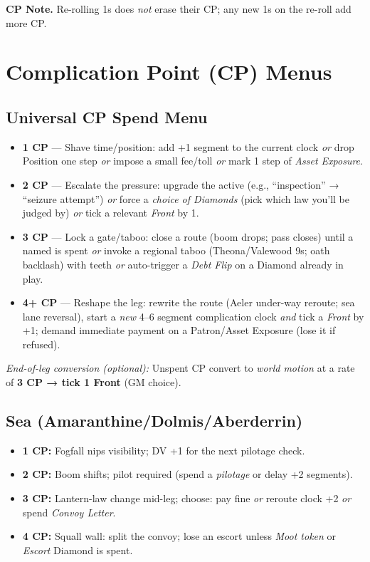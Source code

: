 \noindent\textbf{CP Note.} Re-rolling 1s does \emph{not} erase their CP; any new 1s on the re-roll add more CP.

\section{Complication Point (CP) Menus}

\subsection{Universal CP Spend Menu}
\begin{itemize}
  \item \textbf{1 CP} — Shave time/position: add +1 segment to the current clock \emph{or} drop Position one step \emph{or} impose a small fee/toll \emph{or} mark 1 step of \emph{Asset Exposure}.
  \item \textbf{2 CP} — Escalate the pressure: upgrade the active \SuitClub{} (e.g., ``inspection'' → ``seizure attempt'') \emph{or} force a \emph{choice of Diamonds} (pick which law you'll be judged by) \emph{or} tick a relevant \emph{Front} by 1.
  \item \textbf{3 CP} — Lock a gate/taboo: close a route (boom drops; pass closes) until a named \SuitDiamond{} is spent \emph{or} invoke a regional taboo (Theona/Valewood 9s; oath backlash) with teeth \emph{or} auto-trigger a \emph{Debt Flip} on a Diamond already in play.
  \item \textbf{4+ CP} — Reshape the leg: rewrite the route (Aeler under-way reroute; sea lane reversal), start a \emph{new} 4--6 segment complication clock \emph{and} tick a \emph{Front} by +1; demand immediate payment on a Patron/Asset Exposure (lose it if refused).
\end{itemize}
\textit{End-of-leg conversion (optional):} Unspent CP convert to \emph{world motion} at a rate of \textbf{3 CP → tick 1 Front} (GM choice).

\subsection{Sea (Amaranthine/Dolmis/Aberderrin)}
\begin{itemize}
  \item \textbf{1 CP:} Fogfall nips visibility; DV +1 for the next pilotage check.
  \item \textbf{2 CP:} Boom shifts; pilot required (spend a \emph{pilotage} \SuitDiamond{} or delay +2 segments).
  \item \textbf{3 CP:} Lantern-law change mid-leg; choose: pay fine \emph{or} reroute clock +2 \emph{or} spend \emph{Convoy Letter}.
  \item \textbf{4 CP:} Squall wall: split the convoy; lose an escort unless \emph{Moot token} or \emph{Escort} Diamond is spent.
\end{itemize}

